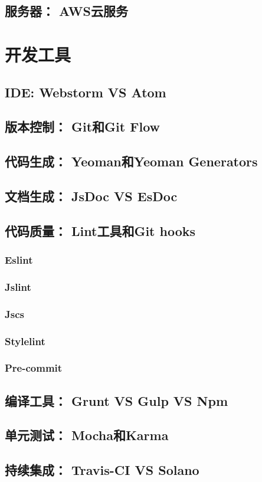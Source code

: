 \subsection{服务器： AWS云服务}

\section{开发工具}
\subsection{IDE: Webstorm VS Atom}
\subsection{版本控制： Git和Git Flow}
\subsection{代码生成： Yeoman和Yeoman Generators}
\subsection{文档生成： JsDoc VS EsDoc}
\subsection{代码质量： Lint工具和Git hooks}
\subsubsection{Eslint}
\subsubsection{Jslint}
\subsubsection{Jscs}
\subsubsection{Stylelint}
\subsubsection{Pre-commit}
\subsection{编译工具： Grunt VS Gulp VS Npm}
\subsection{单元测试： Mocha和Karma}
\subsection{持续集成： Travis-CI VS Solano}


